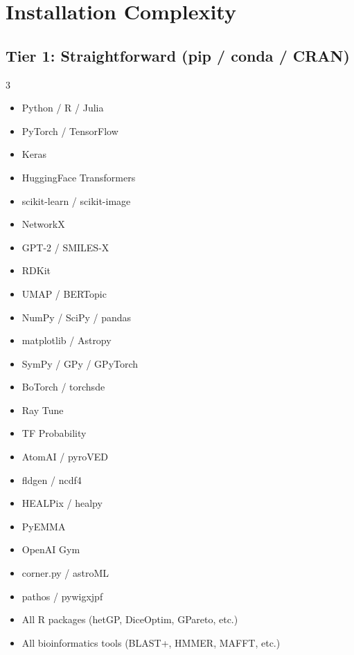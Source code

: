 \documentclass[11pt,letterpaper]{article}
\begin{document}
\section{Installation Complexity}

\subsection{Tier 1: Straightforward (pip / conda / CRAN)}

\begin{multicols}{3}
\begin{itemize}[nosep,leftmargin=*]
\item Python / R / Julia
\item PyTorch / TensorFlow
\item Keras
\item HuggingFace Transformers
\item scikit-learn / scikit-image
\item NetworkX
\item GPT-2 / SMILES-X
\item RDKit
\item UMAP / BERTopic
\item NumPy / SciPy / pandas
\item matplotlib / Astropy
\item SymPy / GPy / GPyTorch
\item BoTorch / torchsde
\item Ray Tune
\item TF Probability
\item AtomAI / pyroVED
\item fldgen / ncdf4
\item HEALPix / healpy
\item PyEMMA
\item OpenAI Gym
\item corner.py / astroML
\item pathos / pywigxjpf
\item All R packages (hetGP, DiceOptim, GPareto, etc.)
\item All bioinformatics tools (BLAST+, HMMER, MAFFT, etc.)
\end{itemize}
\end{multicols}
\end{document}
